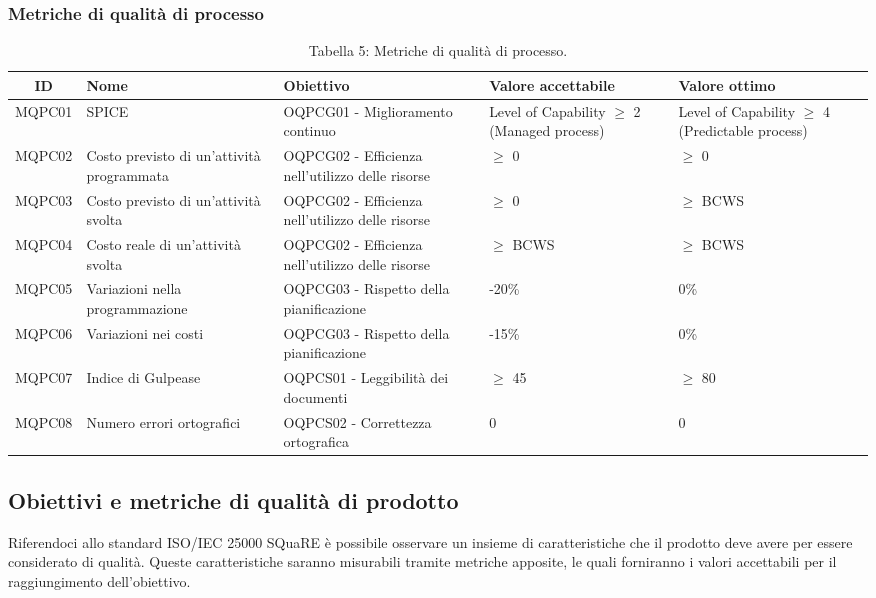 \subsubsection{Metriche di qualità di processo}
\begin{table}[H]
	\centering
	\begin{tabularx}{\textwidth}{|c|X|X|X|X|}
		\hline
		\textbf{ID} & \textbf{Nome} & \textbf{Obiettivo} & \textbf{Valore accettabile} & \textbf{Valore ottimo}\\
		\hline
		MQPC01 & SPICE & OQPCG01 - Miglioramento continuo & Level of Capability $\geq$ 2 (Managed process) & Level of Capability $\geq$ 4 (Predictable process) \\
		\hline
		MQPC02 & Costo previsto di un'attività programmata & OQPCG02 - Efficienza nell'utilizzo delle risorse & $\geq$ 0 & $\geq$ 0 \\
		\hline
		MQPC03 & Costo previsto di un'attività svolta & OQPCG02 - Efficienza nell'utilizzo delle risorse & $\geq$ 0 & $\geq$ BCWS \\
		\hline
		MQPC04 & Costo reale di un'attività svolta & OQPCG02 - Efficienza nell'utilizzo delle risorse & $\geq$ BCWS & $\geq$ BCWS \\
		\hline
		MQPC05 & Variazioni nella programmazione & OQPCG03 - Rispetto della pianificazione & -20\% & 0\% \\
		\hline
		MQPC06 & Variazioni nei costi & OQPCG03 - Rispetto della pianificazione & -15\% & 0\% \\
		\hline
		MQPC07 & Indice di Gulpease & OQPCS01 - Leggibilità dei documenti & $\geq$ 45 & $\geq$ 80 \\
		\hline
		MQPC08 & Numero errori ortografici & OQPCS02 - Correttezza ortografica & 0 & 0 \\
		\hline
	\end{tabularx}
	\caption{Tabella 5: Metriche di qualità di processo.}
\end{table}
\subsection{Obiettivi e metriche di qualità di prodotto}
Riferendoci allo standard ISO/IEC 25000 SQuaRE è possibile osservare un insieme di caratteristiche che il prodotto deve avere per essere considerato di qualità. Queste caratteristiche saranno misurabili tramite metriche apposite, le quali forniranno i valori accettabili per il raggiungimento dell'obiettivo.
